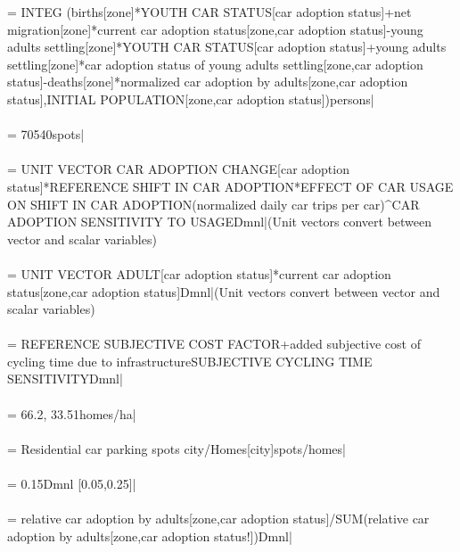  = {\small  INTEG (births[zone]*YOUTH CAR STATUS[car adoption status]+net migration[zone]*current car adoption status[zone,car adoption status]-young adults settling[zone]*YOUTH CAR STATUS[car adoption status]+young adults settling[zone]*car adoption status of young adults settling[zone,car adoption status]-deaths[zone]*normalized car adoption by adults[zone,car adoption status],INITIAL POPULATION[zone,car adoption status])persons|} \\ \\ 
 = {\small 70540spots|} \\ \\ 
 = {\small UNIT VECTOR CAR ADOPTION CHANGE[car adoption status]*REFERENCE SHIFT IN CAR ADOPTION*EFFECT OF CAR USAGE ON SHIFT IN CAR ADOPTION(normalized daily car trips per car)\^{}CAR ADOPTION SENSITIVITY TO USAGEDmnl|}{\small  (Unit vectors convert between vector and scalar variables)} \\ \\ 
 = {\small UNIT VECTOR ADULT[car adoption status]*current car adoption status[zone,car adoption status]Dmnl|}{\small  (Unit vectors convert between vector and scalar variables)} \\ \\ 
 = {\small REFERENCE SUBJECTIVE COST FACTOR+added subjective cost of cycling time due to infrastructure\*SUBJECTIVE CYCLING TIME SENSITIVITYDmnl|} \\ \\ 
 = {\small 66.2, 33.51homes/ha|} \\ \\ 
 = {\small Residential car parking spots city/Homes[city]spots/homes|} \\ \\ 
 = {\small 0.15Dmnl [0.05,0.25]|} \\ \\ 
 = {\small relative car adoption by adults[zone,car adoption status]/SUM(relative car adoption by adults[zone,car adoption status!])Dmnl|} \\ \\ 
